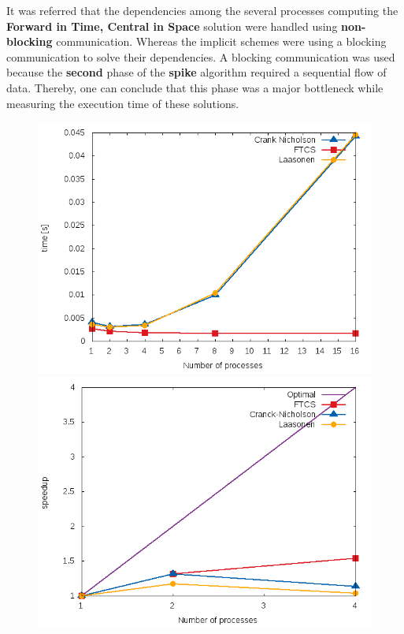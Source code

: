 \documentclass[12pt]{article}
\begin{document}
\par It was referred that the dependencies among the several processes computing the \textbf{Forward in Time, Central in Space} solution were handled using \textbf{non-blocking} communication. Whereas the implicit schemes were using a blocking communication to solve their dependencies. A blocking communication was used because the \textbf{second} phase of the \textbf{spike} algorithm required a sequential flow of data. Thereby, one can conclude that this phase was a major bottleneck while measuring the execution time of these solutions. 

\begin{figure}[!htb]
\centering
\begin{minipage}{.5\textwidth}
  \centering
  \includegraphics[width=1.0\linewidth]{times.png}
\end{minipage}%
\begin{minipage}{.5\textwidth}
  \centering
  \includegraphics[width=1.0\linewidth]{speedup.png}
\end{minipage}
\end{figure}
\end{document}
